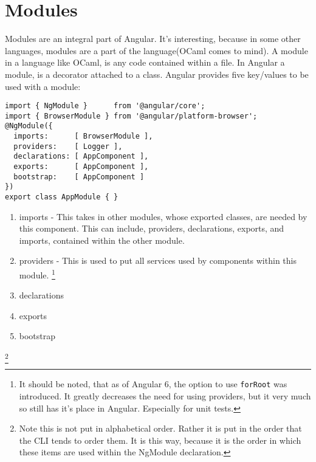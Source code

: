 \section{ Modules }
\maketitle{}

Modules are an integral part of Angular. It's interesting, because in some
other languages, modules are a part of the language(OCaml comes to mind). A
module in a language like OCaml, is any code contained within a file. In Angular
a module, is a decorator attached to a class. Angular provides five key/values
to be used with a module:
\begin{lstlisting}
import { NgModule }      from '@angular/core';
import { BrowserModule } from '@angular/platform-browser';
@NgModule({
  imports:      [ BrowserModule ],
  providers:    [ Logger ],
  declarations: [ AppComponent ],
  exports:      [ AppComponent ],
  bootstrap:    [ AppComponent ]
})
export class AppModule { }
\end{lstlisting}

\begin{enumerate}
  \item imports - This takes in other modules, whose exported classes, are
  needed by this component. This can include, providers, declarations, exports,
  and imports, contained within the other module.
  \item providers - This is used to put all services used by components within
  this module. \footnote{It should be noted, that as of Angular 6, the option
  to use \lstinline{forRoot} was introduced. It greatly decreases the need for
  using providers, but it very much so still has it's place in Angular.
  Especially for unit tests.}
  \item declarations
  \item exports
  \item bootstrap
\end{enumerate}
\footnote{Note this is not put in alphabetical order. Rather it is put in the
order that the CLI tends to order them. It is this way, because it is the order
in which these items are used within the NgModule declaration.}
